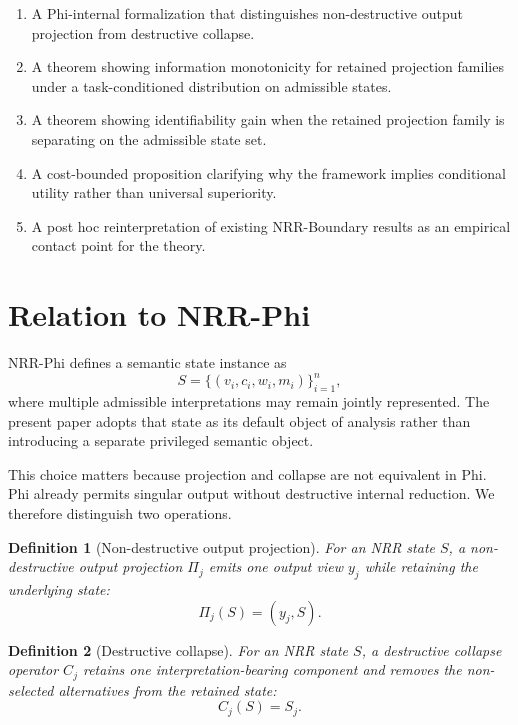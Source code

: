 \documentclass[11pt,a4paper]{article}
\newtheorem{definition}{Definition}
\begin{document}
\begin{enumerate}
  \item A Phi-internal formalization that distinguishes non-destructive output projection from destructive collapse.
  \item A theorem showing information monotonicity for retained projection families under a task-conditioned distribution on admissible states.
  \item A theorem showing identifiability gain when the retained projection family is separating on the admissible state set.
  \item A cost-bounded proposition clarifying why the framework implies conditional utility rather than universal superiority.
  \item A post hoc reinterpretation of existing NRR-Boundary results as an empirical contact point for the theory.
\end{enumerate}

\section{Relation to NRR-Phi}
\label{sec:phi}

NRR-Phi defines a semantic state instance as
\begin{equation}
S = \{(v_i, c_i, w_i, m_i)\}_{i=1}^{n},
\end{equation}
where multiple admissible interpretations may remain jointly represented. The present paper adopts that state as its default object of analysis rather than introducing a separate privileged semantic object.

This choice matters because projection and collapse are not equivalent in Phi. Phi already permits singular output without destructive internal reduction. We therefore distinguish two operations.

\begin{definition}[Non-destructive output projection]
For an NRR state $S$, a non-destructive output projection $\Pi_j$ emits one output view $y_j$ while retaining the underlying state:
\begin{equation}
\Pi_j(S) = (y_j, S).
\end{equation}
\end{definition}

\begin{definition}[Destructive collapse]
For an NRR state $S$, a destructive collapse operator $C_j$ retains one interpretation-bearing component and removes the non-selected alternatives from the retained state:
\begin{equation}
C_j(S) = S_j.
\end{equation}
\end{definition}
\end{document}

